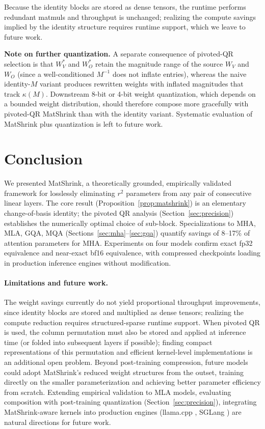 \documentclass{article}
\begin{document}
Because the identity blocks are stored as dense tensors, the runtime performs redundant matmuls and throughput is unchanged; realizing the compute savings implied by the identity structure requires runtime support, which we leave to future work.

\textbf{Note on further quantization.} A separate consequence of pivoted-QR selection is that $W_V^\ast$ and $W_O^\ast$ retain the magnitude range of the source $W_V$ and $W_O$ (since a well-conditioned $M^{-1}$ does not inflate entries), whereas the naive identity-$M$ variant produces rewritten weights with inflated magnitudes that track $\kappa(M)$. Downstream 8-bit or 4-bit weight quantization, which depends on a bounded weight distribution, should therefore compose more gracefully with pivoted-QR MatShrink than with the identity variant. Systematic evaluation of MatShrink plus quantization is left to future work.

\section{Conclusion}
We presented MatShrink, a theoretically grounded, empirically validated framework for losslessly eliminating $r^2$ parameters from any pair of consecutive linear layers. The core result (Proposition~\ref{prop:matshrink}) is an elementary change-of-basis identity; the pivoted QR analysis (Section~\ref{sec:precision}) establishes the numerically optimal choice of sub-block. Specializations to MHA, MLA, GQA, MQA (Sections~\ref{sec:mha}--\ref{sec:gqa}) quantify savings of 8--17\% of attention parameters for MHA.
Experiments on four models confirm exact fp32 equivalence and near-exact bf16 equivalence, with compressed checkpoints loading in production inference engines without modification.

\paragraph{Limitations and future work.}
The weight savings currently do not yield proportional throughput improvements, since identity blocks are stored and multiplied as dense tensors; realizing the compute reduction requires structured-sparse runtime support.
When pivoted QR is used, the column permutation must also be stored and applied at inference time (or folded into subsequent layers if possible); finding compact representations of this permutation and efficient kernel-level implementations is an additional open problem.
Beyond post-training compression, future models could adopt MatShrink's reduced weight structures from the outset, training directly on the smaller parameterization and achieving better parameter efficiency from scratch.
Extending empirical validation to MLA models, evaluating composition with post-training quantization (Section~\ref{sec:precision}), integrating MatShrink-aware kernels into production engines (llama.cpp \citep{llama-cpp}, SGLang \citep{sglang}) are natural directions for future work.




\end{document}

